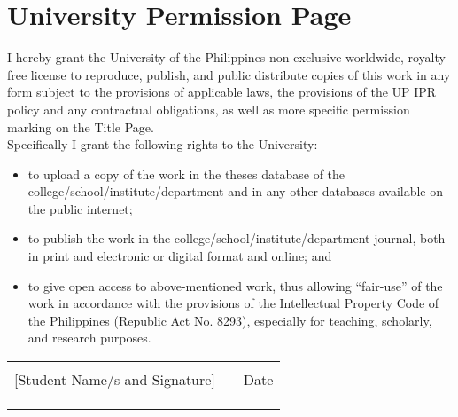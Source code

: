 \newpage
\chapter*{University Permission Page}
\thispagestyle{empty}


I hereby grant the University of the Philippines non-exclusive worldwide,
royalty-free license to reproduce, publish, and public distribute
copies of this work in any form subject to the provisions of applicable
laws, the provisions of the UP IPR policy and any contractual obligations,
as well as more specific permission marking on the Title Page.\\

\noindent Specifically I grant the following rights to the University:
\begin{itemize}
\item to upload a copy of the work in the theses database of the college/school/institute/department
and in any other databases available on the public internet; 
\item to publish the work in the college/school/institute/department journal,
both in print and electronic or digital format and online; and 
\item to give open access to above-mentioned work, thus allowing \textquotedblleft fair-use\textquotedblright{}
of the work in accordance with the provisions of the Intellectual
Property Code of the Philippines (Republic Act No. 8293), especially
for teaching, scholarly, and research purposes. 
\end{itemize}
\vspace*{2cm}

\begin{tabular}{llc}
 &  & \tabularnewline
\cline{1-1} \cline{3-3} 
[Student Name/s and Signature] &  & Date\tabularnewline
 &  & \tabularnewline
 &  & \tabularnewline
 


 \hspace*{10cm} & \hspace*{1cm} & \hspace*{2cm}
\end{tabular}
